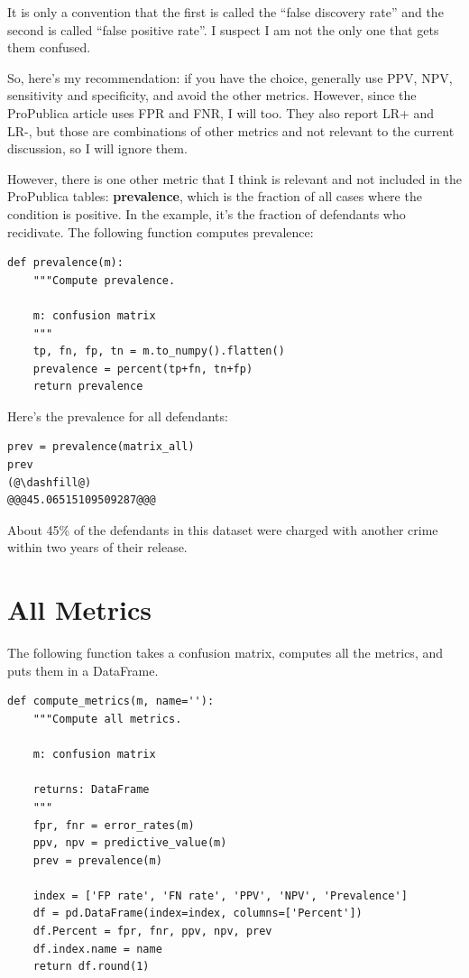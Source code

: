 It is only a convention that the first is called the ``false discovery
rate'' and the second is called ``false positive rate''. I suspect I am
not the only one that gets them confused.

So, here's my recommendation: if you have the choice, generally use PPV,
NPV, sensitivity and specificity, and avoid the other metrics. However,
since the ProPublica article uses FPR and FNR, I will too. They also
report LR+ and LR-, but those are combinations of other metrics and not
relevant to the current discussion, so I will ignore them.

However, there is one other metric that I think is relevant and not
included in the ProPublica tables: \textbf{prevalence}, which is the
fraction of all cases where the condition is positive. In the example,
it's the fraction of defendants who recidivate. The following function
computes prevalence:

\begin{lstlisting}[]
def prevalence(m):
    """Compute prevalence.
    
    m: confusion matrix
    """
    tp, fn, fp, tn = m.to_numpy().flatten()
    prevalence = percent(tp+fn, tn+fp)
    return prevalence
\end{lstlisting}

Here's the prevalence for all defendants:

\begin{lstlisting}[]
prev = prevalence(matrix_all)
prev
(@\dashfill@)
@@@45.06515109509287@@@
\end{lstlisting}

About 45\% of the defendants in this dataset were charged with another
crime within two years of their release.

\hypertarget{all-metrics}{%
\section{All Metrics}\label{all-metrics}}

The following function takes a confusion matrix, computes all the
metrics, and puts them in a DataFrame.

\begin{lstlisting}[]
def compute_metrics(m, name=''):
    """Compute all metrics.
    
    m: confusion matrix
    
    returns: DataFrame
    """
    fpr, fnr = error_rates(m)
    ppv, npv = predictive_value(m)
    prev = prevalence(m)
    
    index = ['FP rate', 'FN rate', 'PPV', 'NPV', 'Prevalence']
    df = pd.DataFrame(index=index, columns=['Percent'])
    df.Percent = fpr, fnr, ppv, npv, prev
    df.index.name = name
    return df.round(1)
\end{lstlisting}

